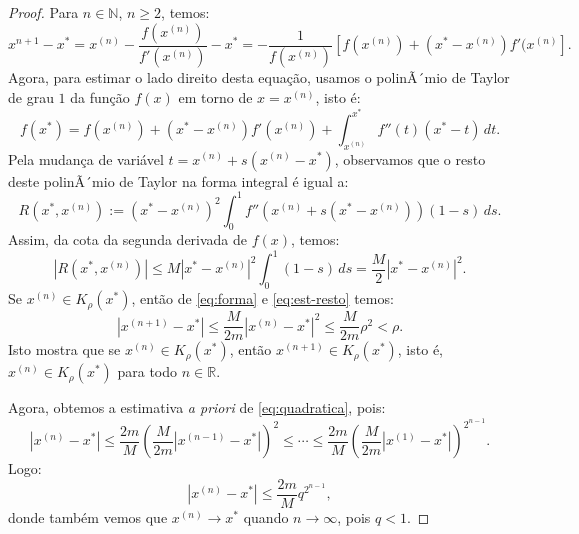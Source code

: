 \documentclass[
	12pt,				%
	oneside,			%
	a4paper,			%
	english,			%
	french,				%
	spanish,			%
	brazil				%
	]{abntex2}
\begin{document}
\begin{proof}
  Para $n\in\mathbb{N}$, $n\geq 2$, temos:
  \begin{equation}\label{eq:forma}
    x^{n+1}-x^* = x^{(n)} - \dfrac{f(x^{(n)})}{f'(x^{(n)})} - x^* = -\dfrac{1}{f(x^{(n)})}\left[f(x^{(n)})+(x^*-x^{(n)})f'(x^{(n)}\right].
  \end{equation}
Agora, para estimar o lado direito desta equação, usamos o polinÃ´mio de Taylor de grau $1$ da função $f(x)$ em torno de $x = x^{(n)}$, isto é:
\begin{equation}
  f(x^*) = f(x^{(n)}) + (x^* - x^{(n)})f'(x^{(n)}) + \int_{x^{(n)}}^{x^*} f''(t)(x^* - t)\,dt.
\end{equation}
Pela mudança de variável $t = x^{(n)} + s(x^{(n)} - x^*)$, observamos que o resto deste polinÃ´mio de Taylor na forma integral é igual a:
\begin{equation}
  R(x^*,x^{(n)}) := (x^* - x^{(n)})^2\int_0^1 f''\left(x^{(n)} + s(x^* - x^{(n)})\right)(1-s)\,ds.
\end{equation}
Assim, da cota da segunda derivada de $f(x)$, temos:
\begin{equation}\label{eq:est-resto}
  |R(x^*,x^{(n)})| \leq M|x^*-x^{(n)}|^2\int_0^1 (1-s)\,ds = \dfrac{M}{2}|x^* - x^{(n)}|^2.
\end{equation}\label{eq:quadratica}
Se $x^{(n)}\in K_\rho(x^*)$, então de \eqref{eq:forma} e \eqref{eq:est-resto} temos:
\begin{equation}
  |x^{(n+1)} - x^*| \leq \dfrac{M}{2m}|x^{(n)} - x^*|^2 \leq \dfrac{M}{2m}\rho^2 < \rho.
\end{equation}
Isto mostra que se $x^{(n)}\in K_\rho(x^*)$, então $x^{(n+1)}\in K_\rho(x^*)$, isto é, $x^{(n)}\in K_\rho(x^*)$ para todo $n\in\mathbb{R}$.

Agora, obtemos a estimativa \emph{a priori} de \eqref{eq:quadratica}, pois:
\begin{equation}
  |x^{(n)} - x^*| \leq \dfrac{2m}{M}\left(\dfrac{M}{2m}|x^{(n-1)}-x^*|\right)^2 \leq \cdots \leq \dfrac{2m}{M}\left(\dfrac{M}{2m} |x^{(1)}-x^*|\right)^{2^{n-1}}.
\end{equation}
Logo:
\begin{equation}
  |x^{(n)} - x^*| \leq \dfrac{2m}{M}q^{2^{n-1}},
\end{equation}
donde também vemos que $x^{(n)}\to x^*$ quando $n\to\infty$, pois $q < 1$.


\end{proof}
\end{document}
